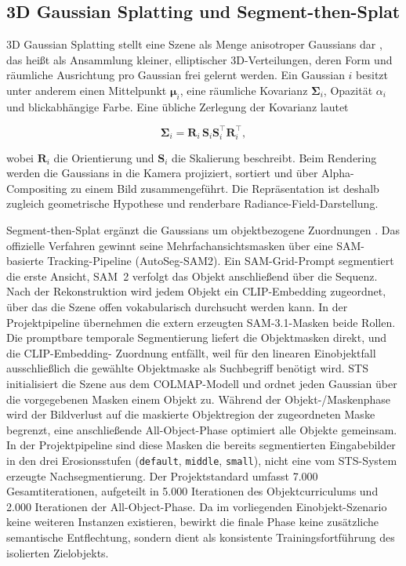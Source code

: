 \subsection{3D Gaussian Splatting und Segment-then-Splat}

3D Gaussian Splatting stellt eine Szene als Menge anisotroper Gaussians dar
\parencite{kerbl2023gaussian}, das heißt als Ansammlung kleiner, elliptischer
3D-Verteilungen, deren Form und räumliche Ausrichtung pro Gaussian frei
gelernt werden. Ein Gaussian $i$ besitzt unter anderem einen
Mittelpunkt $\boldsymbol{\mu}_i$, eine räumliche Kovarianz
$\boldsymbol{\Sigma}_i$, Opazität $\alpha_i$ und blickabhängige Farbe. Eine
übliche Zerlegung der Kovarianz lautet

\begin{equation}
	\boldsymbol{\Sigma}_i =
	\mathbf{R}_i\,\mathbf{S}_i\mathbf{S}_i^{\top}\mathbf{R}_i^{\top},
	\label{eq:gaussian-covariance}
\end{equation}

wobei $\mathbf{R}_i$ die Orientierung und $\mathbf{S}_i$ die Skalierung
beschreibt. Beim Rendering werden die Gaussians in die Kamera projiziert,
sortiert und über Alpha-Compositing zu einem Bild zusammengeführt. Die
Repräsentation ist deshalb zugleich geometrische Hypothese und renderbare
Radiance-Field-Darstellung.

Segment-then-Splat ergänzt die Gaussians um objektbezogene Zuordnungen
\parencite{lu2025segment}. Das offizielle Verfahren gewinnt seine
Mehrfachansichtsmasken über eine SAM-basierte Tracking-Pipeline
(AutoSeg-SAM2). Ein SAM-Grid-Prompt segmentiert die erste Ansicht, SAM~2
verfolgt das Objekt anschließend über die Sequenz. Nach der Rekonstruktion
wird jedem Objekt ein CLIP-Embedding zugeordnet, über das die Szene offen
vokabularisch durchsucht werden kann. In der Projektpipeline übernehmen die
extern erzeugten SAM-3.1-Masken beide Rollen. Die promptbare temporale
Segmentierung liefert die Objektmasken direkt, und die CLIP-Embedding-
Zuordnung entfällt, weil für den linearen Einobjektfall ausschließlich die
gewählte Objektmaske als Suchbegriff benötigt wird. STS initialisiert die
Szene aus dem COLMAP-Modell und ordnet jeden Gaussian über die vorgegebenen
Masken einem Objekt zu. Während der Objekt-/Maskenphase wird der Bildverlust
auf die maskierte Objektregion der zugeordneten Maske begrenzt, eine
anschließende All-Object-Phase optimiert alle Objekte gemeinsam. In der
Projektpipeline sind diese Masken die bereits segmentierten Eingabebilder in
den drei Erosionsstufen (\texttt{default}, \texttt{middle}, \texttt{small}),
nicht eine vom STS-System erzeugte Nachsegmentierung. Der Projektstandard
umfasst 7.000 Gesamtiterationen, aufgeteilt in 5.000 Iterationen des
Objektcurriculums und 2.000 Iterationen der All-Object-Phase. Da im vorliegenden
Einobjekt-Szenario keine weiteren Instanzen existieren, bewirkt die finale
Phase keine zusätzliche semantische Entflechtung, sondern dient als konsistente
Trainingsfortführung des isolierten Zielobjekts.

